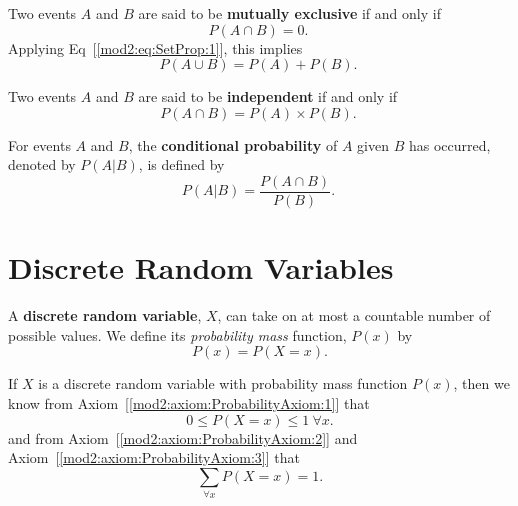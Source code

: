 \begin{defn} \label{mod2:defn:MutuallyExclusive}
Two events $A$ and $B$ are said to be \textbf{mutually exclusive} if and only if
\begin{equation}	
	P ( A \cap B) = 0. \label{mod2:eq:MutuallyExclusive:1} \ 
\end{equation}
Applying Eq~[\ref{mod2:eq:SetProp:1}], this implies 
\begin{equation}
	P(A \cup B) = P(A) + P(B).\  \label{mod2:eq:MutuallyExclusive:2}
\end{equation}
\end{defn}


\begin{defn} \label{mod2:defn:Independent}
Two events $A$ and $B$ are said to be \textbf{independent} if and only if
\begin{equation}
P(A \cap B) = P (A) \times P(B). \label{mod2:eq:Independent} \ 
\end{equation}
\end{defn}

\begin{defn} \label{mod2:defn:Conditional}
For events $A$ and $B$, the \textbf{conditional probability} of $A$ given $B$ has occurred, denoted by $P(A|B)$, is defined by
\begin{equation}
P(A|B) = \frac{P(A\cap B)}{P(B)}. \label{mod2:eq:ConditionalProbability} \ 
\end{equation}
\end{defn}




\section{Discrete Random Variables} \label{mod2:section:DiscreteRandomVariables}


\begin{defn} \label{mod2:defn:DiscreteRandomVar}
	A \textbf{discrete random variable}, $X$, can take on at most a countable number of possible values. We define its \textit{probability mass} function, $P(x)$ by
	\begin{equation}
	P(x) =P(X = x).
	\end{equation}
\end{defn}

\begin{prop}\label{mod2:prop:Discrete:Properties}
	If $X$ is a discrete random variable with probability mass function $P(x)$, then we know from Axiom~[\ref{mod2:axiom:ProbabilityAxiom:1}] that
	\begin{equation}
	0 \leq P(X=x) \leq 1 \: \forall x.
	\end{equation}
	and from Axiom~[\ref{mod2:axiom:ProbabilityAxiom:2}] and Axiom~[\ref{mod2:axiom:ProbabilityAxiom:3}] that
	\begin{equation}
	\sum_{\forall x}P(X=x) = 1 .
	\end{equation}
\end{prop}

